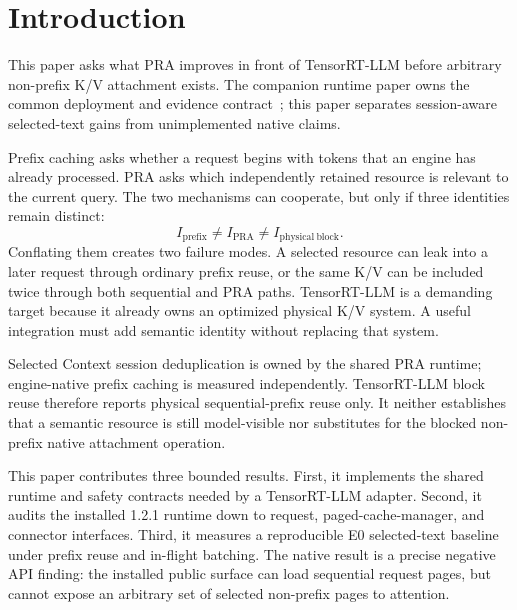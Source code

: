 \documentclass[10pt]{article}
\begin{document}
\section{Introduction}
This paper asks what PRA improves in front of TensorRT-LLM before arbitrary
non-prefix K/V attachment exists. The companion runtime paper owns the common
deployment and evidence contract~\cite{praruntime}; this paper separates
session-aware selected-text gains from unimplemented native claims.

Prefix caching asks whether a request begins with tokens that an engine has
already processed. PRA asks which independently retained resource is relevant
to the current query. The two mechanisms can cooperate, but only if three
identities remain distinct:
\[
I_{\mathrm{prefix}} \ne I_{\mathrm{PRA}} \ne I_{\mathrm{physical\ block}}.
\]
Conflating them creates two failure modes. A selected resource can leak into a
later request through ordinary prefix reuse, or the same K/V can be included
twice through both sequential and PRA paths. TensorRT-LLM is a demanding target
because it already owns an optimized physical K/V system. A useful integration
must add semantic identity without replacing that system.

Selected Context session deduplication is owned by the shared PRA runtime;
engine-native prefix caching is measured independently. TensorRT-LLM block
reuse therefore reports physical sequential-prefix reuse only. It neither
establishes that a semantic resource is still model-visible nor substitutes for
the blocked non-prefix native attachment operation.

This paper contributes three bounded results. First, it implements the shared
runtime and safety contracts needed by a TensorRT-LLM adapter. Second, it audits
the installed 1.2.1 runtime down to request, paged-cache-manager, and connector
interfaces. Third, it measures a reproducible E0 selected-text baseline under
prefix reuse and in-flight batching. The native result is a precise negative
API finding: the installed public surface can load sequential request pages,
but cannot expose an arbitrary set of selected non-prefix pages to attention.
\end{document}
